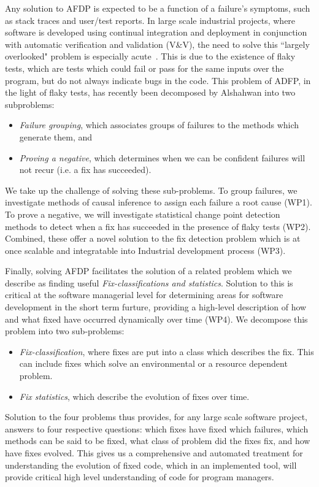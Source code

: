 Any solution to AFDP is expected to be a function of a failure's symptoms, such as stack traces and user/test reports. In large scale industrial projects, where software is developed using continual integration and deployment in conjunction with automatic verification and validation (V\&V), the need to solve this ``largely overlooked" problem is especially acute~\cite{Facebook1}. This is due to the existence of flaky tests, which are tests which could fail or pass for the same inputs over the program, but do not always indicate bugs in the code.
This problem of ADFP, in the light of flaky tests, has recently been decomposed by Alshahwan \etal  into two subproblems: 

\begin{itemize}
\item  \emph{Failure grouping}, which associates groups of failures to the methods which generate them, and 

\item \emph{Proving a negative}, which determines when we can be confident failures will not recur (i.e. a fix has succeeded). 
\end{itemize}

We take up the challenge of solving these sub-problems. To group failures, we investigate methods of causal inference to assign each failure a root cause (WP1).  To prove a negative, we will investigate statistical change point detection methods to detect when a fix has succeeded in the presence of flaky tests (WP2). Combined, these offer a novel solution to the fix detection problem which is at once scalable and integratable into Industrial development process (WP3). 

Finally, solving AFDP facilitates the solution of a related problem which we describe as finding useful \textit{Fix-classifications and statistics}. Solution to this is critical at the software managerial level for determining areas for software development in the short term furture, providing a high-level description of how and what fixed have occurred dynamically over time (WP4).  We decompose this problem into two sub-problems:

\begin{itemize}
\item \textit{Fix-classification}, where fixes are put into a class which describes the fix. This can include fixes which solve an environmental or a resource dependent problem.

\item \textit{Fix statistics}, which describe the evolution of fixes over time.
\end{itemize}

Solution to the four problems thus provides, for any large scale software project, answers to four respective questions: which fixes have fixed which failures, which methods can be said to be fixed, what class of problem did the fixes fix, and how have fixes evolved. This gives us a comprehensive and automated treatment for understanding the evolution of fixed code, which in an implemented tool, will provide critical high level understanding of code for program managers. 